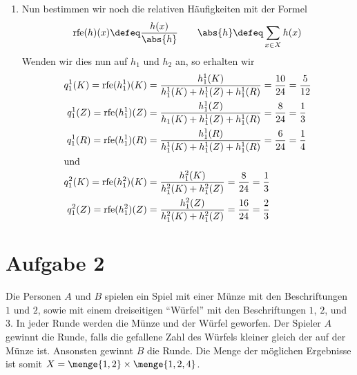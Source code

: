 \documentclass[ngerman, a4paper, 12pt]{article}
\DeclareMathOperator{\rfe}{rfe}
\begin{document}
\begin{enumerate}[label=\textbf{(\alph*)}, leftmargin=0pt]

	\item 
	Nun bestimmen wir noch die relativen Häufigkeiten mit der Formel
	\begin{equation*}
		\rfe(h)(x) \defeq \frac{h(x)}{\abs{h}} \quad \mit \quad \abs{h} \defeq \sum_{x \in X} h(x)
	\end{equation*}
	Wenden wir dies nun auf $h_1$ und $h_2$ an, so erhalten wir
	\begin{align*}
		q_1^1(K) = \rfe(h_1^1)(K) &= \frac{h_1^1(K)}{h_1^1(K) + h_1^1(Z) + h_1^1(R)} = \frac{10}{24} = \frac{5}{12} \\
		q_1^1(Z) = \rfe(h_1^1)(Z) &= \frac{h_1^1(Z)}{h_1(K) + h_1^1(Z) + h_1^1(R)} = \frac{8}{24} = \frac{1}{3} \\
		q_1^1(R) = \rfe(h_1^1)(R) &= \frac{h_1^1(R)}{h_1^1(K) + h_1^1(Z) + h_1^1(R)} = \frac{6}{24} = \frac{1}{4} \\
		\intertext{und}
		q_1^2(K) = \rfe(h_1^2)(K) &= \frac{h_1^2(K)}{h_1^2(K) + h_1^2(Z)} = \frac{8}{24} = \frac{1}{3} \\
		q_1^2(Z) = \rfe(h_1^2)(Z) &= \frac{h_1^2(Z)}{h_1^2(K) + h_1^2(Z)} = \frac{16}{24} = \frac{2}{3} \\
	\end{align*}
\end{enumerate}	
		
\section*{Aufgabe 2}

	Die Personen $A$ und $B$ spielen ein Spiel mit einer Münze mit den Beschriftungen $1$ und $2$, sowie mit einem dreiseitigen \enquote{Würfel} mit den Beschriftungen $1$, $2$, und $3$. In jeder Runde werden die
	Münze und der Würfel geworfen. Der Spieler $A$ gewinnt die Runde, falls die gefallene Zahl des Würfels kleiner gleich der auf der Münze ist. Ansonsten gewinnt $B$ die Runde. Die Menge der möglichen Ergebnisse ist somit $X = \menge{1, 2} \times \menge{1,2,4}$.
	 
\end{document}
